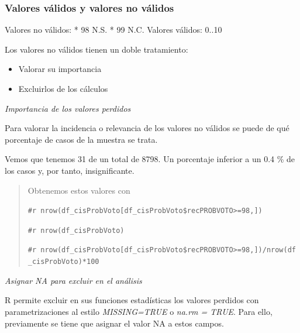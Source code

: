 \documentclass[
]{article}
\newenvironment{Shaded}{\begin{snugshade}}{\end{snugshade}}
\newcommand{\ConstantTok}[1]{\textcolor[rgb]{0.56,0.35,0.01}{#1}}
\newcommand{\DecValTok}[1]{\textcolor[rgb]{0.00,0.00,0.81}{#1}}
\newcommand{\NormalTok}[1]{#1}
\newcommand{\OtherTok}[1]{\textcolor[rgb]{0.56,0.35,0.01}{#1}}
\newcommand{\SpecialCharTok}[1]{\textcolor[rgb]{0.81,0.36,0.00}{\textbf{#1}}}
\providecommand{\tightlist}{%
  \setlength{\itemsep}{0pt}\setlength{\parskip}{0pt}}
\begin{document}
\begin{Shaded}
\end{Shaded}

\hypertarget{valores-vuxe1lidos-y-valores-no-vuxe1lidos}{%
\subsubsection{Valores válidos y valores no
válidos}\label{valores-vuxe1lidos-y-valores-no-vuxe1lidos}}

Valores no válidos: * 98 N.S. * 99 N.C. Valores válidos: 0..10

Los valores no válidos tienen un doble tratamiento:

\begin{itemize}
\tightlist
\item
  Valorar su importancia
\item
  Excluirlos de los cálculos
\end{itemize}

\emph{Importancia de los valores perdidos}

Para valorar la incidencia o relevancia de los valores no válidos se
puede de qué porcentaje de casos de la muestra se trata.

Vemos que tenemos 31 de un total de 8798. Un porcentaje inferior a un
0.4 \% de los casos y, por tanto, insignificante.

\begin{quote}
Obtenemos estos valores con

\texttt{\#r\ nrow(df\_cisProbVoto{[}df\_cisProbVoto\$recPROBVOTO\textgreater{}=98,{]})}

\texttt{\#r\ nrow(df\_cisProbVoto)}

\texttt{\#r\ nrow(df\_cisProbVoto{[}df\_cisProbVoto\$recPROBVOTO\textgreater{}=98,{]})/nrow(df\_cisProbVoto)*100}
\end{quote}

\emph{Asignar NA para excluir en el análisis}

R permite excluir en sus funciones estadísticas los valores perdidos con
parametrizaciones al estilo \emph{MISSING=TRUE} o \emph{na.rm = TRUE}.
Para ello, previamente se tiene que asignar el valor NA a estos campos.

\begin{Shaded}
\end{Shaded}
\end{document}
